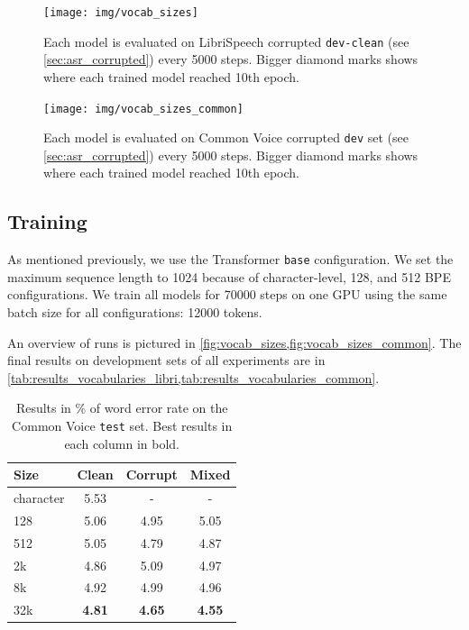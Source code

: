\begin{figure}[p]
	\texttt{[image: img/vocab\_sizes]}
	\caption{Each model is evaluated on LibriSpeech corrupted \texttt{dev-clean} (see \cref{sec:asr_corrupted}) every 5000 steps. Bigger diamond marks shows where each trained model reached 10th epoch.}
	\label{fig:vocab_sizes}
\end{figure}

\begin{figure}[p]
	\texttt{[image: img/vocab\_sizes\_common]}
	\caption{Each model is evaluated on Common Voice corrupted \texttt{dev} set (see \cref{sec:asr_corrupted}) every 5000 steps. Bigger diamond marks shows where each trained model reached 10th epoch.}
	\label{fig:vocab_sizes_common}
\end{figure}


\subsection{Training}

As mentioned previously, we use the Transformer \texttt{base} configuration. We set the maximum sequence length to 1024 because of character-level, 128, and 512 BPE configurations. We train all models for 70000 steps on one GPU using the same batch size for all configurations: 12000 tokens. 

An overview of runs is pictured in \cref{fig:vocab_sizes,fig:vocab_sizes_common}. The final results on development sets of all experiments are in \cref{tab:results_vocabularies_libri,tab:results_vocabularies_common}.


\begin{table}[p]
	\centering
	\begin{tabular}{l|ccc}
		\bf Size & \bf Clean & \bf Corrupt & \bf Mixed \\
		\hline
		character    &    5.53    &    -    &    - \\
		128    &    5.06    &    4.95    &    5.05 \\
		512    &    5.05    &    4.79    &    4.87 \\
		2k    &    4.86    &    5.09    &    4.97 \\
		8k    &    4.92    &    4.99    &    4.96 \\
		32k    &    \textbf{4.81}    &    \textbf{4.65}    &    \textbf{4.55} \\
		
	\end{tabular}
	
	\caption{Results in \% of word error rate on the Common Voice \texttt{test} set. Best results in each column in bold.}
	\label{tab:results_vocabularies_common_test}
\end{table}


